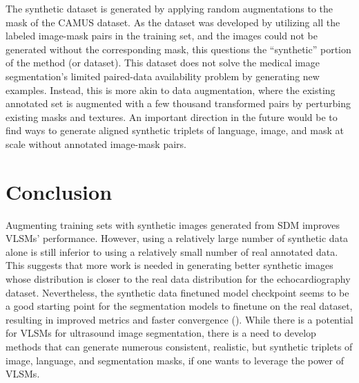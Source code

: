 \documentclass[runningheads]{llncs}
\begin{document}
The synthetic dataset \cite{stojanovski2023echo} is generated by applying random augmentations to the mask of the CAMUS dataset.
As the dataset was developed by utilizing all the labeled image-mask pairs in the training set, and the images could not be generated without the corresponding mask, this questions the ``synthetic'' portion of the method (or dataset).
This dataset does not solve the medical image segmentation's limited paired-data availability problem by generating new examples.
Instead, this is more akin to data augmentation, where the existing annotated set is augmented with a few thousand transformed pairs by perturbing existing masks and textures.
An important direction in the future would be to find ways to generate aligned synthetic triplets of language, image, and mask at scale without annotated image-mask pairs.

\section{Conclusion}

Augmenting training sets with synthetic images generated from SDM improves VLSMs' performance.
However, using a relatively large number of synthetic data alone is still inferior to using a relatively small number of real annotated data.
This suggests that more work is needed in generating better synthetic images whose distribution is closer to the real data distribution for the echocardiography dataset.
Nevertheless, the synthetic data finetuned model checkpoint seems to be a good starting point for the segmentation models to finetune on the real dataset, resulting in improved metrics and faster convergence ().
While there is a  potential for VLSMs for ultrasound image segmentation, there is a need to develop methods that can generate numerous consistent, realistic, but synthetic triplets of image, language, and segmentation masks, if one wants to leverage the power of VLSMs.

%
%
%


%
\end{document}
